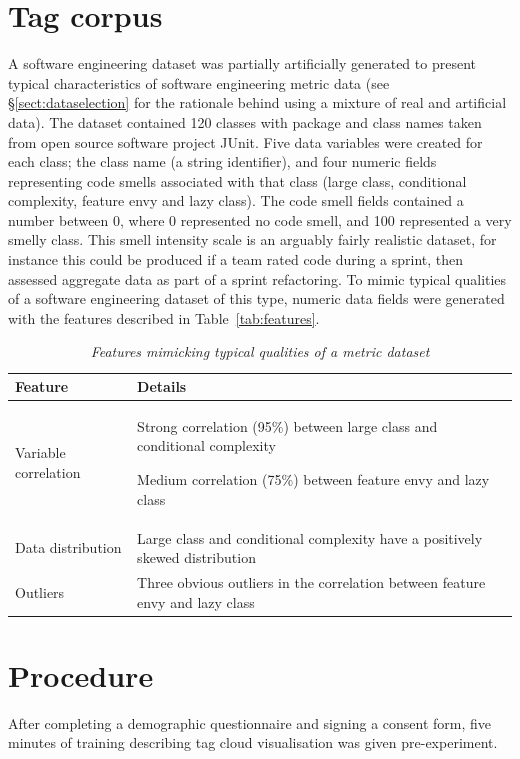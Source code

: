 \section{Tag corpus}
A software engineering dataset was partially artificially generated to present typical characteristics of software engineering metric data (see \S\ref{sect:dataselection} for the rationale behind using a mixture of real and artificial data). The dataset contained 120 classes with package and class names taken from open source software project JUnit. Five data variables were created for each class; the class name (a string identifier), and four numeric fields representing code smells associated with that class (large class, conditional complexity, feature envy and lazy class). The code smell fields contained a number between 0, where 0 represented no code smell, and 100 represented a very smelly class. This smell intensity scale is an arguably fairly realistic dataset, for instance this could be produced if a team rated code during a sprint, then assessed aggregate data as part of a sprint refactoring. To mimic typical qualities of a software engineering dataset of this type, numeric data fields were generated with the features described in Table~\vref{tab:features}. 

\begin{table}
\centering
\caption{\textit{Features mimicking typical qualities of a metric dataset}}
\begin{tabular}{|p{4cm}|p{9cm}|} \hline
\textbf{Feature}&\textbf{Details}\\ \hline
Variable correlation & Strong correlation (95\%) between large class and conditional complexity\par Medium correlation (75\%) between feature envy and lazy class\\ \hline
Data distribution & Large class and conditional complexity have a positively skewed distribution\\ \hline
Outliers &Three obvious outliers in the correlation between feature envy and lazy class\\
\hline\end{tabular}
\label{tab:features}
\end{table}

\section{Procedure}

After completing a demographic questionnaire and signing a consent form, five minutes of training describing tag cloud visualisation was given pre-experiment. 

